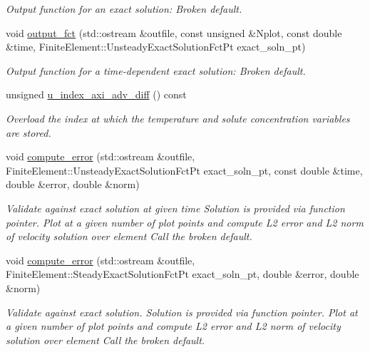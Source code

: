 \begin{DoxyCompactItemize}
\begin{DoxyCompactList}\small\item\em Output function for an exact solution\+: Broken default. \end{DoxyCompactList}\item 
void \hyperlink{classoomph_1_1AxisymmetricQAdvectionCrouzeixRaviartElement_a1ab78e3429b2fd6ce55cd2392d99a270}{output\+\_\+fct} (std\+::ostream \&outfile, const unsigned \&Nplot, const double \&time, Finite\+Element\+::\+Unsteady\+Exact\+Solution\+Fct\+Pt exact\+\_\+soln\+\_\+pt)
\begin{DoxyCompactList}\small\item\em Output function for a time-\/dependent exact solution\+: Broken default. \end{DoxyCompactList}\item 
unsigned \hyperlink{classoomph_1_1AxisymmetricQAdvectionCrouzeixRaviartElement_a7a78a6fac9d174eef5c29328f1a212c8}{u\+\_\+index\+\_\+axi\+\_\+adv\+\_\+diff} () const
\begin{DoxyCompactList}\small\item\em Overload the index at which the temperature and solute concentration variables are stored. \end{DoxyCompactList}\item 
void \hyperlink{classoomph_1_1AxisymmetricQAdvectionCrouzeixRaviartElement_a396031ab3a4a50d6a9f3b8a465ecba3a}{compute\+\_\+error} (std\+::ostream \&outfile, Finite\+Element\+::\+Unsteady\+Exact\+Solution\+Fct\+Pt exact\+\_\+soln\+\_\+pt, const double \&time, double \&error, double \&norm)
\begin{DoxyCompactList}\small\item\em Validate against exact solution at given time Solution is provided via function pointer. Plot at a given number of plot points and compute L2 error and L2 norm of velocity solution over element Call the broken default. \end{DoxyCompactList}\item 
void \hyperlink{classoomph_1_1AxisymmetricQAdvectionCrouzeixRaviartElement_a888aea94c99e6b764c028e39eef7c389}{compute\+\_\+error} (std\+::ostream \&outfile, Finite\+Element\+::\+Steady\+Exact\+Solution\+Fct\+Pt exact\+\_\+soln\+\_\+pt, double \&error, double \&norm)
\begin{DoxyCompactList}\small\item\em Validate against exact solution. Solution is provided via function pointer. Plot at a given number of plot points and compute L2 error and L2 norm of velocity solution over element Call the broken default. \end{DoxyCompactList}\item 

\end{DoxyCompactItemize}
